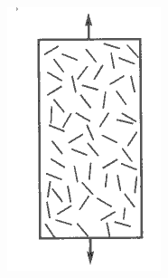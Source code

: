 \begin{figure}[h]
\begin{subfigure}[b]{0.2\textwidth}
\includegraphics[width=\textwidth]{png/composites-types-3.png}
\caption{ }
\end{subfigure}
\begin{subfigure}[b]{0.2\textwidth}
\centering

\end{subfigure}
\end{figure}
